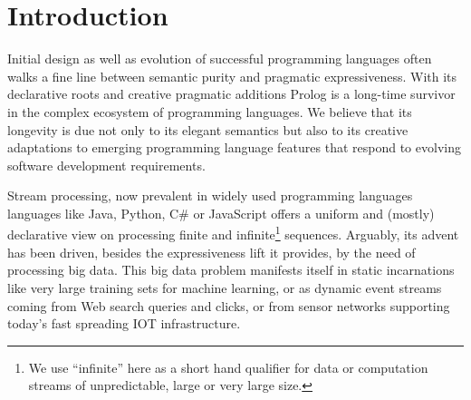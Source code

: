 \documentclass{new_tlp}
\begin{document}
\begin{comment}
\begin{abstract}
Lazy stream generators provide a unified interface to stateful computations, I/O operations as well as algorithms producing finite or infinite sequences. 

As a special instance, we introduce answer stream generators that 
encapsulate the work of coroutining first-class logic engines and support interoperation between forward recursive {\em AND-streams} and backtracking-generated {\em OR-streams}. 

Stream generators are exposed to the application programmer either through an abstract sequence manipulation API or as lazy lists. We define an algebra of stream generator operations that extends Prolog via an embedded language interpreter providing a compact notation for composition mechanisms and supports moving between isomorphic sequence representations.
\end{abstract}
\end{comment}


\section{Introduction}

Initial design as well as evolution of successful programming languages often walks a fine line between semantic purity and pragmatic expressiveness. With its declarative roots and creative pragmatic additions Prolog is a long-time survivor in the complex ecosystem of programming languages. We believe that its longevity is due not only to its elegant semantics but also to its creative adaptations to emerging programming language features that respond to evolving software development requirements.

Stream processing, now prevalent in widely used programming languages languages like Java, Python, C\# or JavaScript offers a uniform and (mostly) declarative view on processing finite 
and infinite\footnote{We use ``infinite'' here as a short hand qualifier for data or computation streams of unpredictable, large or very large size.} sequences. Arguably, its advent has been driven, besides the expressiveness lift it provides, by the need of processing big data. This big data problem manifests itself in static incarnations like very large training sets for machine learning, or as dynamic event streams coming from Web search queries and clicks,  or from sensor networks supporting today's fast spreading IOT infrastructure.
 
\end{document}
